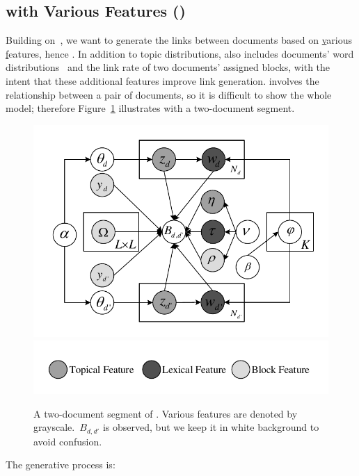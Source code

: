 \subsection{\rtm with Various Features (\vfrtm)}
\label{ssec:gen_links}

Building on~, we want to generate the links
between documents based on \underline{v}arious \underline{f}eatures,
hence \vfrtm.  In addition to topic distributions, \vfrtm also
includes documents' word distributions~\cite{nguyen-2013-lexical} and
the link rate of two documents' assigned blocks, with the intent that
these additional features improve link generation.  \vfrtm involves
the relationship between a pair of documents, so it is difficult to
show the whole model; therefore Figure~\ref{fig:lex_block_rtm}
illustrates with a two-document segment.

\begin{figure}[t!]
  \centering
  \includegraphics[width=.8\linewidth]{2016_acl_docblock/figures/lex_block_rtm.pdf}
  \includegraphics[width=\linewidth]{2016_acl_docblock/figures/lex_block_rtm_legend.pdf}
  \caption{A two-document segment of \vfrtm. Various features are
    denoted by grayscale.~$B_{d,d'}$ is observed, but we keep it in
    white background to avoid confusion.}\label{fig:lex_block_rtm}
  
\end{figure}

\noindent The generative process is:

